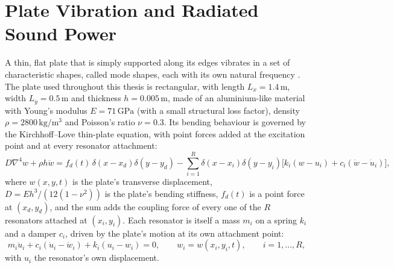 \section{Plate Vibration and Radiated Sound Power}

A thin, flat plate that is simply supported along its edges vibrates in a set of characteristic shapes, called mode shapes, each with its own natural frequency \parencite{leissa1969plate,timoshenko1959plate}. The plate used throughout this thesis is rectangular, with length $L_x = 1.4\,\si{\meter}$, width $L_y = 0.5\,\si{\meter}$ and thickness $h = 0.005\,\si{\meter}$, made of an aluminium-like material with Young's modulus $E = 71\,\si{\giga\pascal}$ (with a small structural loss factor), density $\rho = 2800\,\si{\kilo\gram\per\cubic\meter}$ and Poisson's ratio $\nu = 0.3$. Its bending behaviour is governed by the Kirchhoff--Love thin-plate equation, with point forces added at the excitation point and at every resonator attachment:
\begin{equation}
D \nabla^4 w + \rho h \ddot w = f_d(t)\,\delta(x-x_d)\delta(y-y_d) - \sum_{i=1}^{R} \delta(x-x_i)\delta(y-y_i)\big[k_i(w-u_i) + c_i(\dot w - \dot u_i)\big],
\end{equation}
where $w(x,y,t)$ is the plate's transverse displacement, $D = Eh^3/(12(1-\nu^2))$ is the plate's bending stiffness, $f_d(t)$ is a point force at $(x_d,y_d)$, and the sum adds the coupling force of every one of the $R$ resonators attached at $(x_i,y_i)$. Each resonator is itself a mass $m_i$ on a spring $k_i$ and a damper $c_i$, driven by the plate's motion at its own attachment point:
\begin{equation}
m_i \ddot u_i + c_i(\dot u_i - \dot w_i) + k_i(u_i - w_i) = 0, \qquad w_i = w(x_i, y_i, t), \qquad i = 1, \dots, R,
\end{equation}
with $u_i$ the resonator's own displacement.


